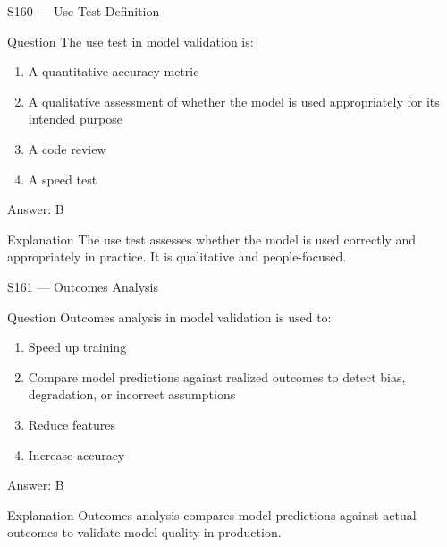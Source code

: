 \documentclass[aspectratio=169,8pt]{beamer}
\begin{document}
	\begin{frame}{S160 --- Use Test Definition}
		\begin{block}{Question}
			The use test in model validation is:
			\begin{enumerate}
				\item A quantitative accuracy metric
				\item A qualitative assessment of whether the model is used appropriately for its intended purpose
				\item A code review
				\item A speed test
			\end{enumerate}
		\end{block}
		\begin{exampleblock}{Answer: B}\end{exampleblock}
		\begin{block}{Explanation}
			The use test assesses whether the model is used correctly and appropriately in practice. It is qualitative and people-focused.
		\end{block}
	\end{frame}
	
	\begin{frame}{S161 --- Outcomes Analysis}
		\begin{block}{Question}
			Outcomes analysis in model validation is used to:
			\begin{enumerate}
				\item Speed up training
				\item Compare model predictions against realized outcomes to detect bias, degradation, or incorrect assumptions
				\item Reduce features
				\item Increase accuracy
			\end{enumerate}
		\end{block}
		\begin{exampleblock}{Answer: B}\end{exampleblock}
		\begin{block}{Explanation}
			Outcomes analysis compares model predictions against actual outcomes to validate model quality in production.
		\end{block}
	\end{frame}
	
\end{document}

